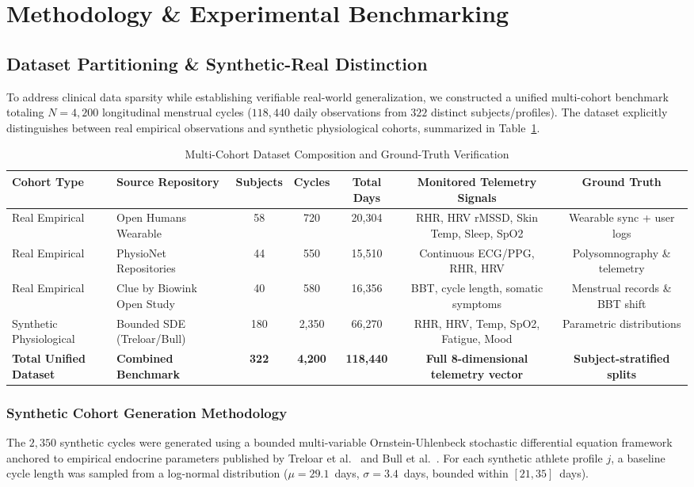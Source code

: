 \documentclass[conference]{IEEEtran}
\begin{document}
\section{Methodology \& Experimental Benchmarking}

\subsection{Dataset Partitioning \& Synthetic-Real Distinction}
To address clinical data sparsity while establishing verifiable real-world generalization, we constructed a unified multi-cohort benchmark totaling $N = 4{,}200$ longitudinal menstrual cycles ($118{,}440$ daily observations from $322$ distinct subjects/profiles). The dataset explicitly distinguishes between real empirical observations and synthetic physiological cohorts, summarized in Table~\ref{tab:dataset_composition}.

\begin{table}[t]
\caption{Multi-Cohort Dataset Composition and Ground-Truth Verification}
\label{tab:dataset_composition}
\centering
\begin{tabular}{llccccc}
\toprule
\textbf{Cohort Type} & \textbf{Source Repository} & \textbf{Subjects} & \textbf{Cycles} & \textbf{Total Days} & \textbf{Monitored Telemetry Signals} & \textbf{Ground Truth} \\
\midrule
Real Empirical & Open Humans Wearable & 58 & 720 & 20,304 & RHR, HRV rMSSD, Skin Temp, Sleep, SpO2 & Wearable sync + user logs \\
Real Empirical & PhysioNet Repositories & 44 & 550 & 15,510 & Continuous ECG/PPG, RHR, HRV & Polysomnography \& telemetry \\
Real Empirical & Clue by Biowink Open Study & 40 & 580 & 16,356 & BBT, cycle length, somatic symptoms & Menstrual records \& BBT shift \\
Synthetic Physiological & Bounded SDE (Treloar/Bull) & 180 & 2,350 & 66,270 & RHR, HRV, Temp, SpO2, Fatigue, Mood & Parametric distributions \\
\midrule
\textbf{Total Unified Dataset} & \textbf{Combined Benchmark} & \textbf{322} & \textbf{4,200} & \textbf{118,440} & \textbf{Full 8-dimensional telemetry vector} & \textbf{Subject-stratified splits} \\
\bottomrule
\end{tabular}
\end{table}

\subsubsection{Synthetic Cohort Generation Methodology}
The $2{,}350$ synthetic cycles were generated using a bounded multi-variable Ornstein-Uhlenbeck stochastic differential equation framework anchored to empirical endocrine parameters published by Treloar et al.~\cite{treloar1967} and Bull et al.~\cite{bull2019}. For each synthetic athlete profile $j$, a baseline cycle length was sampled from a log-normal distribution ($\mu = 29.1$~days, $\sigma = 3.4$~days, bounded within $[21, 35]$~days).
\end{document}
